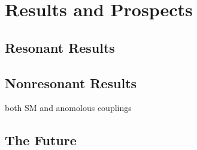 \chapter{Results and Prospects\label{ch:results}}

\section{Resonant Results\label{sec:resresults}}

\section{Nonresonant Results\label{sec:nonresresults}}
both SM and anomolous couplings

\section{The Future\label{sec:future}}

